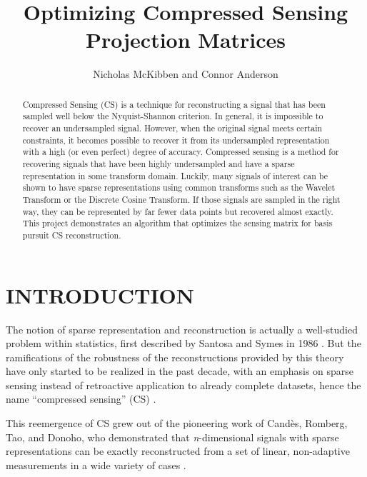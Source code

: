\documentclass[journal]{IEEEtran}
\title{Optimizing Compressed Sensing Projection Matrices}
\author{Nicholas McKibben and Connor Anderson}
\begin{document}
\maketitle
\thispagestyle{empty}
\pagestyle{empty}
\begin{abstract}

Compressed Sensing (CS) is a technique for reconstructing a signal that has been sampled well below the Nyquist-Shannon criterion.  In general, it is impossible to recover an undersampled signal.  However, when the original signal meets certain constraints, it becomes possible to recover it from its undersampled representation with a high (or even perfect) degree of accuracy.  Compressed sensing is a method for recovering signals that have been highly undersampled and have a sparse representation in some transform domain.  Luckily, many signals of interest can be shown to have sparse representations using common transforms such as the Wavelet Transform or the Discrete Cosine Transform. If those signals are sampled in the right way, they can be represented by far fewer data points but recovered almost exactly.  This project demonstrates an algorithm that optimizes the sensing matrix for basis pursuit CS reconstruction.

\end{abstract}

\section{INTRODUCTION}

The notion of sparse representation and reconstruction is actually a well-studied problem within statistics, first described by Santosa and Symes in 1986 \cite{santosa}.  But the ramifications of the robustness of the reconstructions provided by this theory have only started to be realized in the past decade, with an emphasis on sparse sensing instead of retroactive application to already complete datasets, hence the name ``compressed sensing'' (CS) \cite{donoho}.

This reemergence of CS grew out of the pioneering work of Cand\`es, Romberg, Tao, and Donoho, who demonstrated that \emph{n}-dimensional signals with sparse representations can be exactly reconstructed from a set of linear, non-adaptive measurements in a wide variety of cases \cite{csbook,baraniuk,candes,donoho}.
\end{document}
